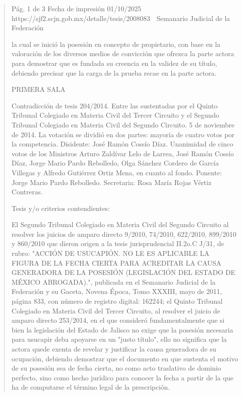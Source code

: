 \documentclass[11pt,a4paper]{article}
\begin{document}
\begin{quote}
                                              Pág. 1 de 3             Fecha de impresión 01/10/2025
  https://sjf2.scjn.gob.mx/detalle/tesis/2008083
                                                   Semanario Judicial de la Federación

la cual se inició la posesión en concepto de propietario, con base en la valoración de los diversos
medios de convicción que ofrezca la parte actora para demostrar que es fundada su creencia en la
validez de su título, debiendo precisar que la carga de la prueba recae en la parte actora.

PRIMERA SALA


Contradicción de tesis 204/2014. Entre las sustentadas por el Quinto Tribunal Colegiado en Materia
Civil del Tercer Circuito y el Segundo Tribunal Colegiado en Materia Civil del Segundo Circuito. 5 de
noviembre de 2014. La votación se dividió en dos partes: mayoría de cuatro votos por la
competencia. Disidente: José Ramón Cossío Díaz. Unanimidad de cinco votos de los Ministros
Arturo Zaldívar Lelo de Larrea, José Ramón Cossío Díaz, Jorge Mario Pardo Rebolledo, Olga
Sánchez Cordero de García Villegas y Alfredo Gutiérrez Ortiz Mena, en cuanto al fondo. Ponente:
Jorge Mario Pardo Rebolledo. Secretaria: Rosa María Rojas Vértiz Contreras.

Tesis y/o criterios contendientes:

El Segundo Tribunal Colegiado en Materia Civil del Segundo Circuito al resolver los juicios de
amparo directo 9/2010, 74/2010, 622/2010, 899/2010 y 860/2010 que dieron origen a la tesis
jurisprudencial II.2o.C J/31, de rubro: "ACCIÓN DE USUCAPIÓN. NO LE ES APLICABLE LA
FIGURA DE LA FECHA CIERTA PARA ACREDITAR LA CAUSA GENERADORA DE LA
POSESIÓN (LEGISLACIÓN DEL ESTADO DE MÉXICO ABROGADA).", publicada en el Semanario
Judicial de la Federación y su Gaceta, Novena Época, Tomo XXXIII, mayo de 2011, página 833, con
número de registro digital: 162244; el Quinto Tribunal Colegiado en Materia Civil del Tercer Circuito,
al resolver el juicio de amparo directo 253/2014, en el que consideró fundamentalmente que si bien
la legislación del Estado de Jalisco no exige que la posesión necesaria para usucapir deba
apoyarse en un "justo título", ello no significa que la actora quede exenta de revelar y justificar la
causa generadora de su ocupación, debiendo demostrar que el documento en que sustenta el
motivo de su posesión sea de fecha cierta, no como acto traslativo de dominio perfecto, sino como
hecho jurídico para conocer la fecha a partir de la que ha de computarse el término legal de la
prescripción.


\end{quote}
\end{document}
